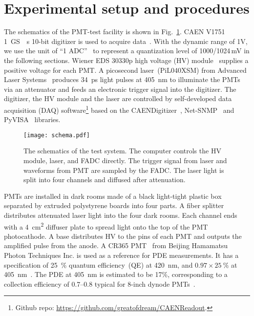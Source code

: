 \section{Experimental setup and procedures}
\label{SetUp}
The schematics of the PMT-test facility is shown in Fig.~\ref{fig:facility}. CAEN V1751 \SI{1}{GS \per s} 10-bit digitizer is used to acquire data~\cite{CAENV1751}. With the dynamic range of 1V, we use the unit of ``1 ADC''~\cite{JUNOPrototype} to represent a quantization level of 1000/1024\,mV in the following sections. Wiener EDS 30330p high voltage (HV) module~\cite{WIENERHV} supplies a positive voltage for each PMT. A picosecond laser~(PiL040XSM) from Advanced Laser Systems~\cite{NTKLaser} produces \SI{34}{ps} light pulses at \SI{405}{nm} to illuminate the PMTs via an attenuator and feeds an electronic trigger signal into the digitizer. The digitizer, the HV module and the laser are controlled by self-developed data acquisition (DAQ) software\footnote{Github repo: \url{https://github.com/greatofdream/CAENReadout}.} based on the CAENDigitizer~\cite{CAENLIB}, Net-SNMP~\cite{SNMP} and PyVISA~\cite{VISA} libraries.

\begin{figure}[!htbp]
    \centering
    \texttt{[image: schema.pdf]}
    \caption{The schematics of the test system. The computer controls the HV module, laser, and FADC directly. The trigger signal from laser and waveforms from PMT are sampled by the FADC. The laser light is split into four channels and diffused after attenuation.}
    \label{fig:facility}
\end{figure}

PMTs are installed in dark rooms made of a black light-tight plastic box separated by extruded polystyrene boards into four parts. A fiber splitter distributes attenuated laser light into the four dark rooms. Each channel ends with a \SI{4}{cm\tothe{2}} diffuser plate to spread light onto the top of the PMT photocathode.
A base distributes HV to the pins of each PMT and outputs the amplified pulse from the anode. A CR365 PMT~\cite{BJBS} from Beijing Hamamatsu Photon Techniques Inc. is used as a reference for PDE measurements.  It has a specification of \SI{25}{\percent} quantum efficiency~(QE) at \SI{420}{nm}, and \(0.97 \times \SI{25}{\percent}\) at \SI{405}{nm}~\cite{HAMAMATSUManual}. The PDE at \SI{405}{nm} is estimated to be 17\%, corresponding to a collection efficiency of 0.7--0.8 typical for 8-inch dynode PMTs~\cite{WANG2012113,R5912MOD,RCESpotlight}.

